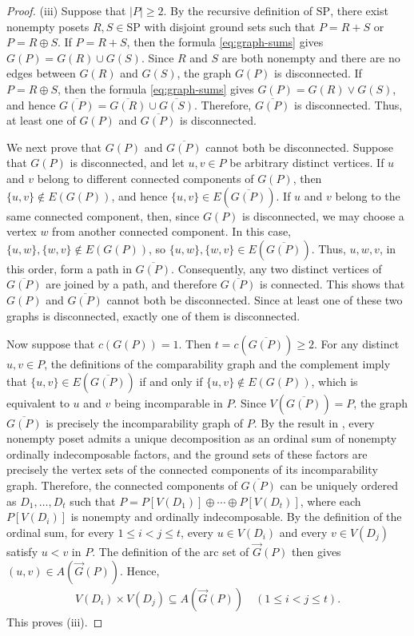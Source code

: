 \documentclass[11pt,a4paper]{article}
\begin{document}
\begin{proof}
\textup{(iii)}
Suppose that $|P|\geq 2$.
By the recursive definition of $\mathrm{SP}$, 
there exist nonempty posets $R,S\in\mathrm{SP}$ with disjoint ground sets 
such that $P=R+S$ or $P=R\oplus S$.
If $P=R+S$, then the formula \eqref{eq:graph-sums} gives $G(P)=G(R)\cup G(S)$.
Since $R$ and $S$ are both nonempty and there are no edges between $G(R)$ and $G(S)$, 
the graph $G(P)$ is disconnected.
If $P=R\oplus S$, then the formula \eqref{eq:graph-sums} gives $G(P)=G(R)\vee G(S)$, 
and hence $\overline{G(P)}=\overline{G(R)}\cup\overline{G(S)}$.
Therefore, $\overline{G(P)}$ is disconnected.
Thus, at least one of $G(P)$ and $\overline{G(P)}$ is disconnected.

We next prove that $G(P)$ and $\overline{G(P)}$ cannot both be disconnected.
Suppose that $G(P)$ is disconnected, and let $u,v\in P$ be arbitrary distinct vertices.
If $u$ and $v$ belong to different connected components of $G(P)$,
then $\{u,v\}\notin E(G(P))$, and hence $\{u,v\}\in E(\overline{G(P)})$.
If $u$ and $v$ belong to the same connected component,
then, since $G(P)$ is disconnected, we may choose a vertex $w$ from another connected component.
In this case, $\{u,w\},\{w,v\}\notin E(G(P))$, so $\{u,w\},\{w,v\}\in E(\overline{G(P)})$.
Thus, $u,w,v$, in this order, form a path in $\overline{G(P)}$.
Consequently, any two distinct vertices of $\overline{G(P)}$
are joined by a path, and therefore $\overline{G(P)}$ is connected.
This shows that $G(P)$ and $\overline{G(P)}$ cannot both be disconnected.
Since at least one of these two graphs is disconnected,
exactly one of them is disconnected.

Now suppose that $c(G(P))=1$. Then $t=c(\overline{G(P)})\geq 2$.
For any distinct $u,v\in P$, the definitions of the comparability graph 
and the complement imply that $\{u,v\}\in E(\overline{G(P)})$ if and only if
$\{u,v\}\notin E(G(P))$, which is equivalent to $u$ and $v$ being incomparable in $P$.
Since $V(\overline{G(P)})=P$, the graph $\overline{G(P)}$ 
is precisely the incomparability graph of $P$.
By the result in \cite{ErneHeitzigReinhold2002},
every nonempty poset admits a unique decomposition
as an ordinal sum of nonempty ordinally indecomposable factors,
and the ground sets of these factors are precisely the vertex sets
of the connected components of its incomparability graph.
Therefore, the connected components of $\overline{G(P)}$
can be uniquely ordered as $D_1,\ldots,D_t$ such that
$P=P[V(D_1)]\oplus\cdots\oplus P[V(D_t)]$,
where each $P[V(D_i)]$ is nonempty and ordinally indecomposable.
By the definition of the ordinal sum, for every $1\leq i<j\leq t$, 
every $u\in V(D_i)$ and every $v\in V(D_j)$ satisfy $u<v$ in $P$.
The definition of the arc set of $\vec G(P)$ then gives $(u,v)\in A(\vec G(P))$.
Hence, 
\begin{eqnarray*}
V(D_i)\times V(D_j)\subseteq A(\vec G(P))\quad(1\leq i<j\leq t).
\end{eqnarray*}
This proves \textup{(iii)}.
\end{proof}
\end{document}
